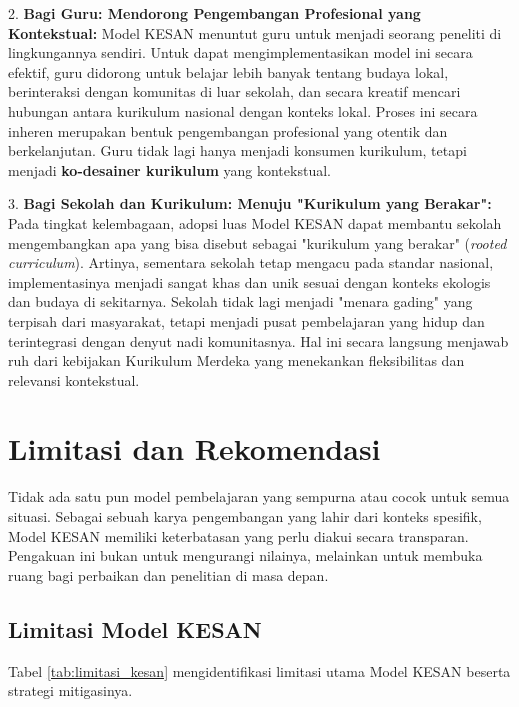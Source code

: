 \documentclass[12pt,a4paper,oneside]{book}
\begin{document}
2.  \textbf{Bagi Guru: Mendorong Pengembangan Profesional yang Kontekstual:}
    Model KESAN menuntut guru untuk menjadi seorang peneliti di lingkungannya sendiri. Untuk dapat mengimplementasikan model ini secara efektif, guru didorong untuk belajar lebih banyak tentang budaya lokal, berinteraksi dengan komunitas di luar sekolah, dan secara kreatif mencari hubungan antara kurikulum nasional dengan konteks lokal. Proses ini secara inheren merupakan bentuk pengembangan profesional yang otentik dan berkelanjutan. Guru tidak lagi hanya menjadi konsumen kurikulum, tetapi menjadi \textbf{ko-desainer kurikulum} yang kontekstual.

3.  \textbf{Bagi Sekolah dan Kurikulum: Menuju "Kurikulum yang Berakar":}
    Pada tingkat kelembagaan, adopsi luas Model KESAN dapat membantu sekolah mengembangkan apa yang bisa disebut sebagai "kurikulum yang berakar" (\textit{rooted curriculum}). Artinya, sementara sekolah tetap mengacu pada standar nasional, implementasinya menjadi sangat khas dan unik sesuai dengan konteks ekologis dan budaya di sekitarnya. Sekolah tidak lagi menjadi "menara gading" yang terpisah dari masyarakat, tetapi menjadi pusat pembelajaran yang hidup dan terintegrasi dengan denyut nadi komunitasnya. Hal ini secara langsung menjawab ruh dari kebijakan Kurikulum Merdeka yang menekankan fleksibilitas dan relevansi kontekstual.

\section{Limitasi dan Rekomendasi}

Tidak ada satu pun model pembelajaran yang sempurna atau cocok untuk semua situasi. Sebagai sebuah karya pengembangan yang lahir dari konteks spesifik, Model KESAN memiliki keterbatasan yang perlu diakui secara transparan. Pengakuan ini bukan untuk mengurangi nilainya, melainkan untuk membuka ruang bagi perbaikan dan penelitian di masa depan.

\subsection{Limitasi Model KESAN}

Tabel \ref{tab:limitasi_kesan} mengidentifikasi limitasi utama Model KESAN beserta strategi mitigasinya.
\end{document}

